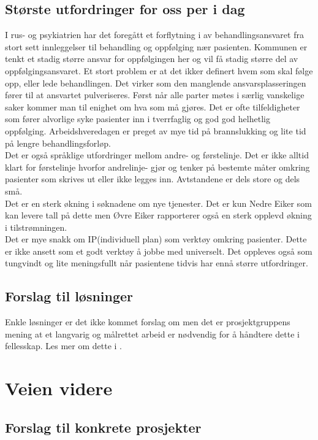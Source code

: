 \documentclass[11pt]{report} %
\begin{document}
                \section{Største utfordringer for oss per i dag} \label{chap:disk_utf}
                  I rus- og psykiatrien har det foregått et forflytning i av behandlingsansvaret fra stort sett innleggelser til behandling og oppfølging nær pasienten. Kommunen er tenkt et stadig større ansvar for oppfølgingen her og vil få stadig større del av oppfølgingsansvaret. Et stort problem er at det ikker definert hvem som skal følge opp, eller lede behandlingen. Det virker som den manglende ansvarsplasseringen fører til at ansvartet pulveriseres. Først når alle parter møtes i særlig vanskelige saker kommer man til enighet om hva som må gjøres. Det er ofte tilfeldigheter som fører alvorlige syke pasienter inn i tverrfaglig og god god helhetlig oppfølging. Arbeidshveredagen er preget av mye tid på brannslukking og lite tid på lengre behandlingsforløp.\\
                  Det er også språklige utfordringer mellom andre- og førstelinje. Det er ikke alltid klart for førstelinje hvorfor andrelinje- gjør og tenker på bestemte måter omkring pasienter som skrives ut eller ikke legges inn. Avtstandene er dels store og dels små.\\
                  Det er en sterk økning i søknadene om nye tjenester. Det er kun Nedre Eiker som kan levere tall på dette men Øvre Eiker rapporterer også en sterk opplevd økning i tilstrømningen.\\
                  Det er mye snakk om IP(individuell plan) som verktøy omkring pasienter. Dette er ikke ansett som et godt verktøy å jobbe med universelt. Det oppleves også som tungvindt og lite meningsfullt når pasientene tidvis har ennå større utfordringer.

                \section{Forslag til løsninger}\label{chap:disk_losn}
                  Enkle løsninger er det ikke kommet forslag om men det er prosjektgruppens mening at et langvarig og målrettet arbeid er nødvendig for å håndtere dette i fellesskap. Les mer om dette i .
              \chapter{Veien videre}\label{chap:vvidere}
                \section{Forslag til konkrete prosjekter}\label{chap:vvidere_konkpr}
\end{document}

